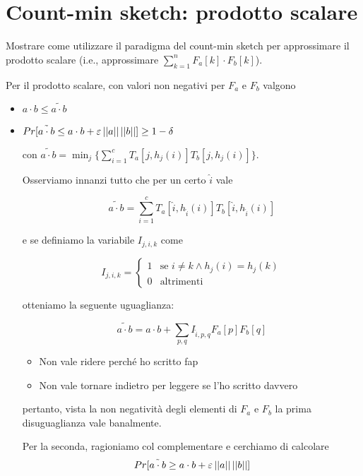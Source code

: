 \chapter{Count-min sketch: prodotto scalare}

\begin{problem*}
    Mostrare come utilizzare il paradigma del count-min sketch per approssimare il
    prodotto scalare (i.e., approssimare \(\sum_{k=1}^n{F_a[k]\cdot F_b[k]}\)).
\end{problem*}

Per il prodotto scalare, con valori non negativi per $F_a$ e $F_b$ valgono
\begin{itemize}
    \item $a \cdot b \le \tilde{a \cdot b}$
    \item $Pr[\tilde{a \cdot b} \le a \cdot b
        + \varepsilon \left|\left|a\right|\right|\left|\left|b\right|\right|] \ge 1 - \delta$

    con $\displaystyle \tilde{a \cdot b} = \min_j\{\sum_{i=1}^{c}T_a[j,h_j(i)]T_b[j,h_j(i)]\}$.

    \begin{proof*}
    Osserviamo innanzi tutto che per un certo $\hat{i}$ vale
    
    \[
        \tilde{a \cdot b} = \sum_{i=1}^c T_a[\hat{i}, h_{\hat{i}}(i)] T_b[\hat{i}, h_{\hat{i}}(i)]
    \]

    e se definiamo la variabile $I_{j, i, k}$ come

    \[
        I_{j, i, k} =
        \begin{cases}
            1 & \mbox{se } i \neq k \land h_j(i) = h_j(k) \\
            0 & \mbox{altrimenti}
        \end{cases}
    \]

    otteniamo la seguente uguaglianza:

    \[
        \tilde{a \cdot b} = a \cdot b + \sum_{p, q} I_{\hat{i}, p, q} F_a[p] F_b[q]
    \]

    \begin{itemize}
    \item Non vale ridere perché ho scritto fap
    \item Non vale tornare indietro per leggere se l'ho scritto davvero
    \end{itemize}

    pertanto, vista la non negatività degli elementi di $F_a$ e $F_b$ la prima
    disuguaglianza vale banalmente.

    Per la seconda, ragioniamo col complementare e cerchiamo di calcolare
    \[ Pr[\tilde{a \cdot b} \ge a \cdot b + \varepsilon \left|\left|a\right|\right|\left|\left|b\right|\right|] \]


\end{proof*}
\end{itemize}

